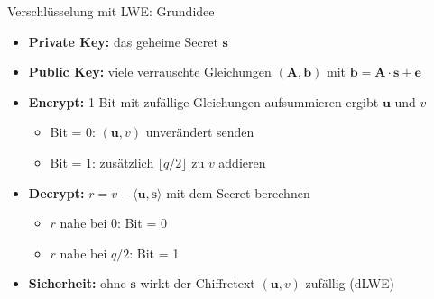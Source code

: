 \begin{frame}{Verschlüsselung mit LWE: Grundidee}
    \begin{itemize}
        \item \textbf{Private Key:} das geheime Secret $\mathbf{s}$
        \item \textbf{Public Key:} viele verrauschte Gleichungen $(\mathbf{A}, \mathbf{b})$ mit $\mathbf{b} = \mathbf{A} \cdot \mathbf{s} + \mathbf{e}$
        \item {
            \textbf{Encrypt:} 1 Bit mit zufällige Gleichungen aufsummieren ergibt $\mathbf{u}$ und $v$
            \begin{itemize}
                \item Bit = 0: $(\mathbf{u}, v)$ unverändert senden
                \item Bit = 1: zusätzlich $\lfloor q/2 \rfloor$ zu $v$ addieren
            \end{itemize}
        }
        \item {
            \textbf{Decrypt:} $r = v - \langle \mathbf{u}, \mathbf{s} \rangle$ mit dem Secret berechnen
            \begin{itemize}
                \item $r$ nahe bei $0$: Bit = 0
                \item $r$ nahe bei $q/2$: Bit = 1
            \end{itemize}
        }
        \item \textbf{Sicherheit:} ohne $\mathbf{s}$ wirkt der Chiffretext $(\mathbf{u}, v)$ zufällig (dLWE)
    \end{itemize}
\end{frame}

